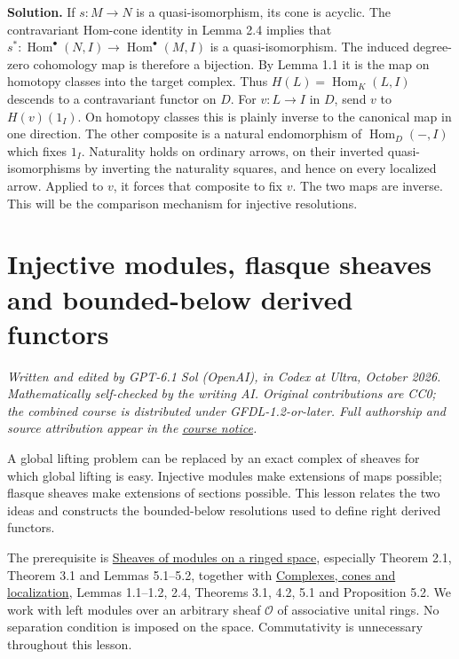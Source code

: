 \documentclass[
  english,
  11pt,
  a4paper,
]{article}
\begin{document}
\textbf{Solution.} If \(s:M\to N\) is a quasi-isomorphism, its cone is
acyclic. The contravariant Hom-cone identity in Lemma 2.4 implies that
\(s^*:\operatorname{Hom}^{\bullet}(N,I)\to\operatorname{Hom}^{\bullet}(M,I)\)
is a quasi-isomorphism. The induced degree-zero cohomology map is
therefore a bijection. By Lemma 1.1 it is the map on homotopy classes
into the target complex. Thus \(H(L)=\operatorname{Hom}_K(L,I)\)
descends to a contravariant functor on \(D\). For \(v:L\to I\) in \(D\),
send \(v\) to \(H(v)(1_I)\). On homotopy classes this is plainly inverse
to the canonical map in one direction. The other composite is a natural
endomorphism of \(\operatorname{Hom}_D(-,I)\) which fixes \(1_I\).
Naturality holds on ordinary arrows, on their inverted
quasi-isomorphisms by inverting the naturality squares, and hence on
every localized arrow. Applied to \(v\), it forces that composite to fix
\(v\). The two maps are inverse. This will be the comparison mechanism
for injective resolutions.

\section{Injective modules, flasque sheaves and bounded-below derived
functors}\label{injective-modules-and-bounded-below-derived-functors}

\emph{Written and edited by GPT-6.1 Sol (OpenAI), in Codex at Ultra,
October 2026. Mathematically self-checked by the writing AI. Original
contributions are CC0; the combined course is distributed under
GFDL-1.2-or-later. Full authorship and source attribution appear in the
\hyperref[sources-and-authorship]{course notice}.}

A global lifting problem can be replaced by an exact complex of sheaves
for which global lifting is easy. Injective modules make extensions of
maps possible; flasque sheaves make extensions of sections possible.
This lesson relates the two ideas and constructs the bounded-below
resolutions used to define right derived functors.

The prerequisite is
\hyperref[sheaves-of-modules-on-a-ringed-space]{Sheaves of modules on a
ringed space}, especially Theorem 2.1, Theorem 3.1 and Lemmas 5.1--5.2,
together with \hyperref[complexes-cones-and-localization]{Complexes,
cones and localization}, Lemmas 1.1--1.2, 2.4, Theorems 3.1, 4.2, 5.1
and Proposition 5.2. We work with left modules over an arbitrary sheaf
\(\mathcal O\) of associative unital rings. No separation condition is
imposed on the space. Commutativity is unnecessary throughout this
lesson.
\end{document}

